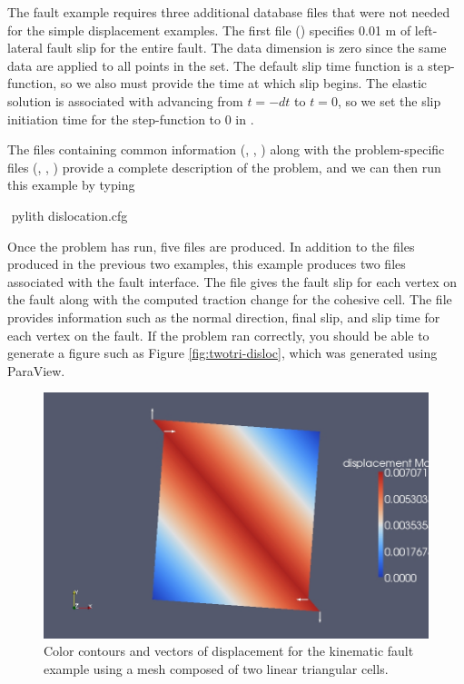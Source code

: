 The fault example requires three additional database files that were
not needed for the simple displacement examples. The first file
() specifies 0.01 m of
left-lateral fault slip for the entire fault.  The data dimension is
zero since the same data are applied to all points in the set. The
default slip time function is a step-function, so we also must provide
the time at which slip begins. The elastic solution is associated with
advancing from $t=-dt$ to $t=0$, so we set the slip initiation time
for the step-function to 0 in
.

The files containing common information (,
, ) along with
the problem-specific files (,
,
) provide a complete
description of the problem, and we can then run this example by typing
\begin{shell}
$$ pylith dislocation.cfg
\end{shell}
Once the problem has run, five files are produced. In addition to the
files produced in the previous two examples, this example produces two
files associated with the fault interface. The file
 gives the fault slip for
each vertex on the fault along with the computed traction change for
the cohesive cell. The file 
provides information such as the normal direction, final slip, and
slip time for each vertex on the fault. If the problem ran correctly,
you should be able to generate a figure such as Figure
\vref{fig:twotri-disloc}, which was generated using ParaView.

\begin{figure}
  \includegraphics[scale=0.33]{examples/figs/twotri3-dislocation}
  \caption{Color contours and vectors of displacement for the kinematic fault
    example using a mesh composed of two linear triangular cells.}
  \label{fig:twotri-disloc}
\end{figure}

